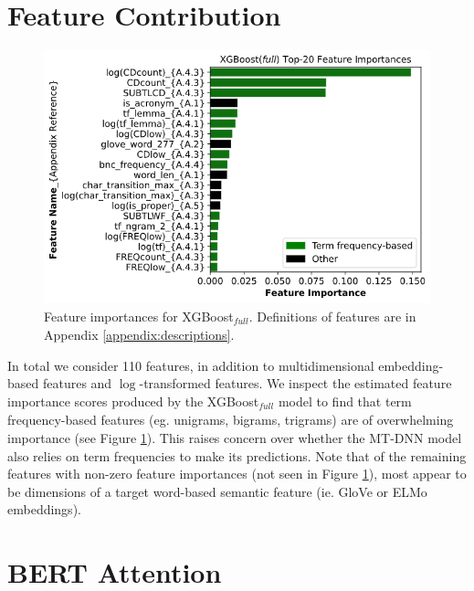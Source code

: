 \documentclass{dcthesis}
\theoremstyle{definition}
\theoremstyle{remark}
\begin{document}
\section{Feature Contribution}

\begin{figure}
  \centering
  \includegraphics[scale=0.6]{xgboost_feature_importances.png}
  \captionsetup{justification=centering}
  \caption{\label{fig:xgboost_feature_importance} Feature importances for XGBoost$_\textit{full}$. Definitions of features are in Appendix \ref{appendix:descriptions}.}
\end{figure}

In total we consider 110 features, in addition to multidimensional embedding-based features and $\log$-transformed features. We inspect the estimated feature importance scores produced by the XGBoost$_\textit{full}$ model to find that term frequency-based features (eg. unigrams, bigrams, trigrams) are of overwhelming importance (see Figure \ref{fig:xgboost_feature_importance}). This raises concern over whether the MT-DNN model also relies on term frequencies to make its predictions. Note that of the remaining features with non-zero feature importances (not seen in Figure \ref{fig:xgboost_feature_importance}), most appear to be dimensions of a target word-based semantic feature (ie. GloVe or ELMo embeddings).

\section{BERT Attention}
\end{document}
